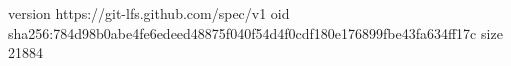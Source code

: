 version https://git-lfs.github.com/spec/v1
oid sha256:784d98b0abe4fe6edeed48875f040f54d4f0cdf180e176899fbe43fa634ff17c
size 21884
